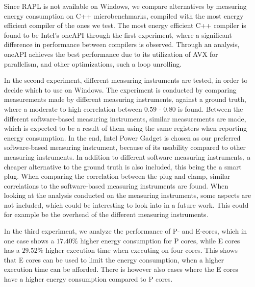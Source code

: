 Since RAPL is not available on Windows, we compare alternatives by measuring energy consumption on C++ microbenchmarks, compiled with the most energy efficient compiler of the ones we test. The most energy efficient C++ compiler is found to be Intel's oneAPI through the first experiment, where a significant difference in performance between compilers is observed. Through an analysis, oneAPI achieves the best performance due to its utilization of AVX for parallelism, and other optimizations, such a loop unrolling.


In the second experiment, different measuring instruments are tested, in order to decide which to use on Windows. The experiment is conducted by comparing measurements made by different measuring instruments, against a ground truth, where a moderate to high correlation between $0.59$ - $0.80$ is found. Between the different software-based measuring instruments, similar measurements are made, which is expected to be a result of them using the same registers when reporting energy consumption. In the end, Intel Power Gadget is chosen as our preferred software-based measuring instrument, because of its usability compared to other measuring instruments. In addition to different software measuring instruments, a cheaper alternative to the ground truth is also included, this being the a smart plug. When comparing the correlation between the plug and clamp, similar correlations to the software-based measuring instruments are found. When looking at the analysis conducted on the measuring instruments, some aspects are not included, which could be interesting to look into in a future work. This could for example be the overhead of the different measuring instruments.

In the third experiment, we analyze the performance of P- and E-cores, which in one case shows a $17.40\%$ higher energy consumption for P cores, while E cores has a $29.52\%$ higher execution time when executing on four cores. This shows that E cores can be used to limit the energy consumption, when a higher execution time can be afforded. There is however also cases where the E cores have a higher energy consumption compared to P cores.



